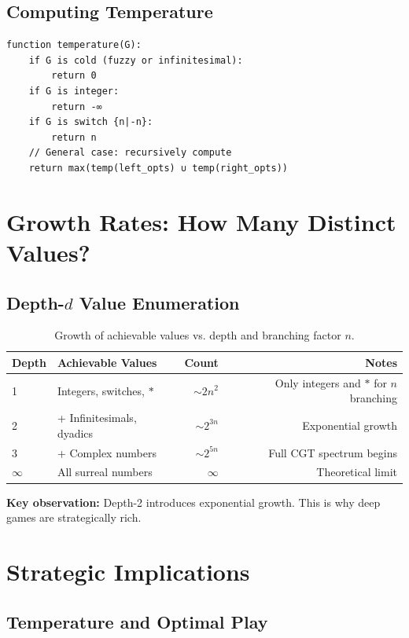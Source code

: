 \documentclass[10pt,a4paper,twocolumn]{article}
\theoremstyle{plain}
\theoremstyle{definition}
\theoremstyle{remark}
\begin{document}
\subsection{Computing Temperature}

\begin{verbatim}
function temperature(G):
    if G is cold (fuzzy or infinitesimal):
        return 0
    if G is integer:
        return -∞
    if G is switch {n|-n}:
        return n
    // General case: recursively compute
    return max(temp(left_opts) ∪ temp(right_opts))
\end{verbatim}

\section{Growth Rates: How Many Distinct Values?}

\subsection{Depth-$d$ Value Enumeration}

\begin{table}[ht]
\centering
\small
\begin{tabular}{@{}llrr@{}}
\toprule
Depth & Achievable Values & Count & Notes \\
\midrule
1 & Integers, switches, $*$ & $\sim 2n^2$ & Only integers and $*$ for $n$ branching \\
2 & + Infinitesimals, dyadics & $\sim 2^{3n}$ & Exponential growth \\
3 & + Complex numbers & $\sim 2^{5n}$ & Full CGT spectrum begins \\
$\infty$ & All surreal numbers & $\infty$ & Theoretical limit \\
\bottomrule
\end{tabular}
\caption{Growth of achievable values vs. depth and branching factor $n$.}
\end{table}

\textbf{Key observation:} Depth-2 introduces exponential growth. This is why deep games are strategically rich.

\section{Strategic Implications}

\subsection{Temperature and Optimal Play}
\end{document}
